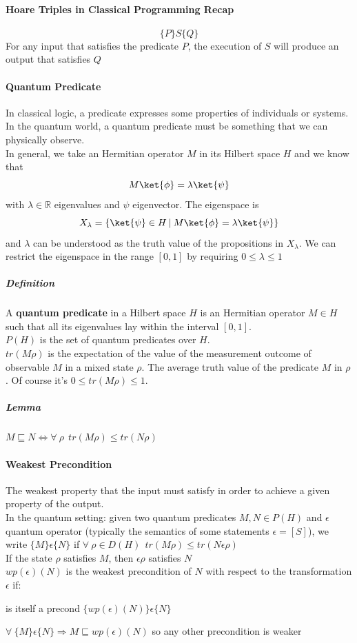 \documentclass[10pt]{report}
\begin{document}
\paragraph{Hoare Triples in Classical Programming Recap} $$\{P\}S\{Q\}$$
For any input that satisfies the predicate $P$, the execution of $S$ will produce an output that satisfies $Q$
\paragraph{Quantum Predicate} In classical logic, a predicate expresses some properties of individuals or systems. In the quantum world, a quantum predicate must be something that we can physically observe.\\
In general, we take an Hermitian operator $M$ in its Hilbert space $H$ and we know that $$M\ket{\phi}=\lambda\ket{\psi}$$ with $\lambda\in\mathbb{R}$ eigenvalues and $\psi$ eigenvector. The eigenspace is
$$X_\lambda=\{\ket{\psi}\in H\:|\:M\ket{\phi} = \lambda\ket{\psi}\}$$ and $\lambda$ can be understood as the truth value of the propositions in $X_\lambda$. We can restrict the eigenspace in the range $[0,1]$ by requiring $0\leq \lambda\leq 1$
\subparagraph{Definition} A \textbf{quantum predicate} in a Hilbert space $H$ is an Hermitian operator $M\in H$ such that all its eigenvalues lay within the interval $[0,1]$.\\
$P(H)$ is the set of quantum predicates over $H$.\\
$tr(M\rho)$ is the expectation of the value of the measurement outcome of observable $M$ in a mixed state $\rho$. The average truth value of the predicate $M$ in $\rho$. Of course it's $0\leq tr(M\rho)\leq 1$.
\subparagraph{Lemma} $M\sqsubseteq N \Leftrightarrow \forall\:\rho\:\:tr(M\rho)\leq tr(N\rho)$
\paragraph{Weakest Precondition} The weakest property that the input must satisfy in order to achieve a given property of the output.\\
In the quantum setting: given two quantum predicates $M,N\in P(H)$ and $\epsilon$ quantum operator (typically the semantics of some statements $\epsilon = [S]$), we write $\{M\}\epsilon\{N\}$ if $\forall\:\rho\in D(H)\:\: tr(M\rho)\leq tr(N\epsilon\rho)$\\
If the state $\rho$ satisfies $M$, then $\epsilon\rho$ satisfies $N$\\
$wp(\epsilon)(N)$ is the weakest precondition of $N$ with respect to the transformation $\epsilon$ if:\begin{list}{}{}
	\item is itself a precond $\{wp(\epsilon)(N)\}\epsilon\{N\}$
	\item $\forall\:\{M\}\epsilon\{N\}\Rightarrow M\sqsubseteq wp(\epsilon)(N)$ so any other precondition is weaker
\end{list}
\end{document}
